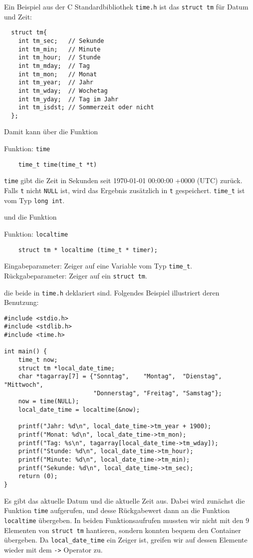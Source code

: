 Ein Beispiel aus der C Standardbibliothek \verb|time.h| ist das \verb|struct tm| für Datum und Zeit:
\begin{lstlisting}
  struct tm{
    int tm_sec;   // Sekunde
    int tm_min;   // Minute
    int tm_hour;  // Stunde
    int tm_mday;  // Tag
    int tm_mon;   // Monat
    int tm_year;  // Jahr
    int tm_wday;  // Wochetag
    int tm_yday;  // Tag im Jahr
    int tm_isdst; // Sommerzeit oder nicht
  };
\end{lstlisting}
Damit kann über die Funktion
\begin{myexampleblock}{Funktion: \texttt{time}}
  \begin{lstlisting}
    time_t time(time_t *t)
  \end{lstlisting}
  \vspace{-0.4cm}
  \verb|time| gibt die Zeit in Sekunden seit 1970-01-01 00:00:00 +0000 (UTC) zurück.
  Falls \verb|t| nicht \verb|NULL| ist, wird das Ergebnis zusätzlich in \verb|t| gespeichert.
  \verb|time_t| ist vom Typ \verb|long int|.
\end{myexampleblock}
und die Funktion
\begin{myexampleblock}{Funktion: \texttt{localtime}}
  \begin{lstlisting}
    struct tm * localtime (time_t * timer);
  \end{lstlisting}
  \vspace{-0.4cm}
  Eingabeparameter: Zeiger auf eine Variable vom Typ \verb|time_t|.
  Rückgabeparameter: Zeiger auf ein \verb|struct tm|.
\end{myexampleblock}
die beide in \verb|time.h| deklariert sind.
Folgendes Beispiel illustriert deren Benutzung:
\begin{lstlisting}
#include <stdio.h>
#include <stdlib.h>
#include <time.h>

int main() {
    time_t now;
    struct tm *local_date_time;
    char *tagarray[7] = {"Sonntag",    "Montag",  "Dienstag", "Mittwoch",
                         "Donnerstag", "Freitag", "Samstag"};
    now = time(NULL);
    local_date_time = localtime(&now);

    printf("Jahr: %d\n", local_date_time->tm_year + 1900);
    printf("Monat: %d\n", local_date_time->tm_mon);
    printf("Tag: %s\n", tagarray[local_date_time->tm_wday]);
    printf("Stunde: %d\n", local_date_time->tm_hour);
    printf("Minute: %d\n", local_date_time->tm_min);
    printf("Sekunde: %d\n", local_date_time->tm_sec);
    return (0);
}
\end{lstlisting}
Es gibt das aktuelle Datum und die aktuelle Zeit aus.
Dabei wird zunächst die Funktion \verb|time| aufgerufen, und desse Rückgabewert dann an die Funktion \verb|localtime| übergeben.
In beiden Funktionsaufrufen mussten wir nicht mit den $9$ Elementen von \verb|struct tm| hantieren, sondern konnten bequem den Container übergeben.
Da \verb|local_date_time| ein Zeiger ist, greifen wir auf dessen Elemente wieder mit dem \verb|->| Operator zu.
